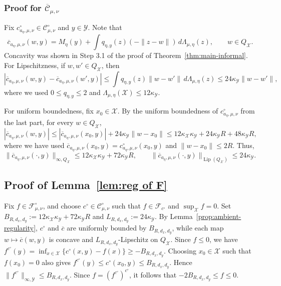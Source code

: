 \documentclass[11pt]{amsart}
\theoremstyle{definition}
\theoremstyle{remark}
\newcommand{\1}{\mathbf{1}}
\newcommand{\Lip}{\operatorname{Lip}}
\numberwithin{equation}{section}
\begin{document}
\subsubsection*{Proof for $\overline{\mathcal C}_{\mu, \nu}$}
Fix $c^\circ_{a_\eta,\mu,\nu}\in\mathcal C^\circ_{\mu,\nu}$ and
$y\in \mathcal Y$. Note that 
\[
\overline{c}_{a_\eta,\mu,\nu}(w,y)
=
M_\eta(y)
+
\int q_{\eta,y}(z)(-\|z-w\|)\,d\Lambda_{\mu,\eta}(z),
\qquad w\in Q_{\mathcal X}.
\]
Concavity was shown in Step 3.1 of the proof of Theorem~\ref{thm:main-informal}. For
Lipschitzness, if $w,w'\in Q_{\mathcal X}$, then
\[
\left|\overline{c}_{a_\eta,\mu,\nu}(w,y)
-
\overline{c}_{a_\eta,\mu,\nu}(w',y) \right|
\le
\int q_{\eta,y}(z)\|w-w'\|\,d\Lambda_{\mu,\eta}(z)
\le
24\kappa_{\mathcal Y} \|w-w'\|,
\]
where we used $0\le q_{\eta,y}\le 2$ and
$\Lambda_{\mu,\eta}(\mathcal X)\le 12\kappa_{\mathcal Y}$.

For uniform boundedness, fix $x_0\in \mathcal X$. By the uniform
boundedness of $c^\circ_{a_\eta,\mu,\nu}$ from the last part,
for every $w\in Q_{\mathcal X}$,
\[
|\overline{c}_{a_\eta,\mu,\nu}(w,y)|
\le
|\overline{c}_{a_\eta,\mu,\nu}(x_0,y)|
+
24\kappa_{\mathcal Y}\|w-x_0\|
\le
12\kappa_\mathcal{X}\kappa_\mathcal{Y}
+
24\kappa_\mathcal{Y}R
+
48\kappa_{\mathcal Y}R,
\]
where we have used
$\overline{c}_{a_\eta,\mu,\nu}(x_0,y)
=c^\circ_{a_\eta,\mu,\nu}(x_0,y)$ and $\|w-x_0\|\le 2R$. Thus,
\[
\|\overline{c}_{a_\eta,\mu,\nu}(\cdot, y)\|_{\infty,Q_{\mathcal X}}
\le
12\kappa_\mathcal{X}\kappa_\mathcal{Y}
+
72\kappa_\mathcal{Y}R,
\qquad
\|\overline{c}_{a_\eta,\mu,\nu}(\cdot, y)\|_{\Lip(Q_{\mathcal X})}
\le
24\kappa_{\mathcal Y}.
\]


\subsection{Proof of Lemma~\ref{lem:reg of F}}
\label{pf:dual-potential-regularity}

Fix $f\in\mathcal F^\circ_{\mu,\nu}$, and choose
$c^\circ\in\mathcal C^\circ_{\mu,\nu}$ such that
$f\in\mathcal F_{c^\circ}$ and $\sup_{\mathcal X}f=0$. Set
$B_{R,d_x,d_y}:=12\kappa_{\mathcal X}\kappa_{\mathcal Y}
+72\kappa_{\mathcal Y}R$ and
$L_{R,d_x,d_y}:=24\kappa_{\mathcal Y}$. By Lemma~\ref{prop:ambient-regularity},
$c^\circ$ and $\overline c$ are uniformly bounded by
$B_{R,d_x,d_y}$, while each map
$w\mapsto\overline c(w,y)$ is concave and
$L_{R,d_x,d_y}$-Lipschitz on $Q_{\mathcal X}$. Since $f\le0$, we have
$f^{c^\circ}(y)=\inf_{x\in\mathcal X}
\{c^\circ(x,y)-f(x)\}\ge-B_{R,d_x,d_y}$. Choosing
$x_0\in\mathcal X$ such that $f(x_0)=0$ also gives
$f^{c^\circ}(y)\le c^\circ(x_0,y)\le B_{R,d_x,d_y}$.
Hence $\|f^{c^\circ}\|_{\infty,\mathcal Y}\le B_{R,d_x,d_y}$.
Since $f=(f^{c^\circ})^{c^\circ}$, it follows that
$-2B_{R,d_x,d_y}\le f\le0$.
\end{document}
